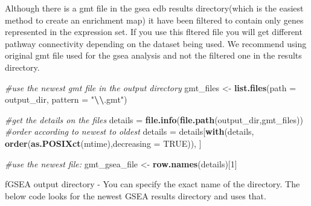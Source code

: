 \documentclass[
]{book}
\newenvironment{Shaded}{\begin{snugshade}}{\end{snugshade}}
\newcommand{\AttributeTok}[1]{\textcolor[rgb]{0.13,0.29,0.53}{#1}}
\newcommand{\CommentTok}[1]{\textcolor[rgb]{0.56,0.35,0.01}{\textit{#1}}}
\newcommand{\ConstantTok}[1]{\textcolor[rgb]{0.56,0.35,0.01}{#1}}
\newcommand{\DecValTok}[1]{\textcolor[rgb]{0.00,0.00,0.81}{#1}}
\newcommand{\FunctionTok}[1]{\textcolor[rgb]{0.13,0.29,0.53}{\textbf{#1}}}
\newcommand{\NormalTok}[1]{#1}
\newcommand{\OtherTok}[1]{\textcolor[rgb]{0.56,0.35,0.01}{#1}}
\newcommand{\SpecialCharTok}[1]{\textcolor[rgb]{0.81,0.36,0.00}{\textbf{#1}}}
\newcommand{\StringTok}[1]{\textcolor[rgb]{0.31,0.60,0.02}{#1}}
\begin{document}
Although there is a gmt file in the gsea edb results directory(which is the easiest method to create an enrichment map) it have been filtered to contain only genes represented in the expression set. If you use this fltered file you will get different pathway connectivity depending on the dataset being used. We recommend using original gmt file used for the gsea analysis and not the filtered one in the results directory.

\begin{Shaded}
\begin{Highlighting}[]
\CommentTok{\#use the newest gmt file in the output directory}
\NormalTok{gmt\_files }\OtherTok{\textless{}{-}} \FunctionTok{list.files}\NormalTok{(}\AttributeTok{path =}\NormalTok{ output\_dir, }\AttributeTok{pattern =} \StringTok{"}\SpecialCharTok{\textbackslash{}\textbackslash{}}\StringTok{.gmt"}\NormalTok{)}

  \CommentTok{\#get the details on the files}
\NormalTok{  details }\OtherTok{=} \FunctionTok{file.info}\NormalTok{(}\FunctionTok{file.path}\NormalTok{(output\_dir,gmt\_files))}
  \CommentTok{\#order according to newest to oldest}
\NormalTok{  details }\OtherTok{=}\NormalTok{ details[}\FunctionTok{with}\NormalTok{(details, }\FunctionTok{order}\NormalTok{(}\FunctionTok{as.POSIXct}\NormalTok{(mtime),}\AttributeTok{decreasing =} \ConstantTok{TRUE}\NormalTok{)), ]}

  \CommentTok{\#use the newest file:}
\NormalTok{ gmt\_gsea\_file }\OtherTok{\textless{}{-}} \FunctionTok{row.names}\NormalTok{(details)[}\DecValTok{1}\NormalTok{]}
\end{Highlighting}
\end{Shaded}

fGSEA output directory - You can specify the exact name of the directory. The below code looks for the newest GSEA results directory and uses that.
\end{document}
